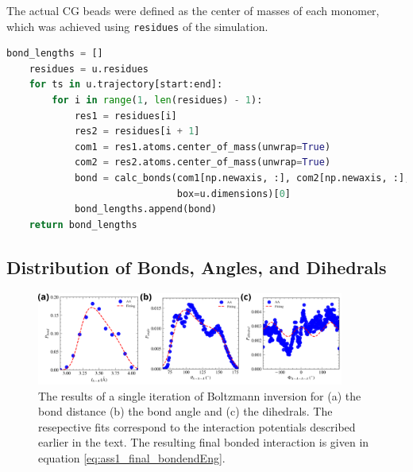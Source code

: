 \documentclass[10pt,a4paper]{labreport}
\begin{document}
  The actual CG beads were defined as the center of masses of each monomer, which was achieved using \texttt{residues} of the simulation.
  
  \begin{lstlisting}[language=Python, 
    caption={An example on how the CG beads are defined from the all-atom simulation. The example is used when determining the bond lengths of the CG model.},
    label=lst:ass1_residues,
    ]
  bond_lengths = []
    residues = u.residues
    for ts in u.trajectory[start:end]:
        for i in range(1, len(residues) - 1):
            res1 = residues[i]
            res2 = residues[i + 1]
            com1 = res1.atoms.center_of_mass(unwrap=True)
            com2 = res2.atoms.center_of_mass(unwrap=True)
            bond = calc_bonds(com1[np.newaxis, :], com2[np.newaxis, :], 
                              box=u.dimensions)[0]
            bond_lengths.append(bond)
    return bond_lengths
  \end{lstlisting}
  \subsection{Distribution of Bonds, Angles, and Dihedrals}
  \begin{figure}[h]
    \centering 
    \includegraphics[width = 0.9\textwidth]{figs/ass1_probs.png}
    \caption{The results of a single iteration of Boltzmann inversion for (a) the bond distance (b) the bond angle and (c) the dihedrals. The resepective fits correspond to the interaction potentials described earlier in the text. The resulting final bonded interaction is given in equation \eqref{eq:ass1_final_bondendEng}.}
    \label{fig:ass1_distribs}
  \end{figure}
\end{document}
